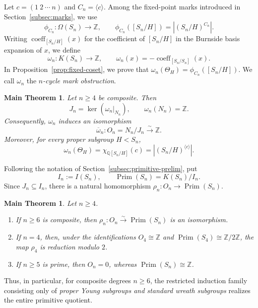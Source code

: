 \documentclass[a4paper,11pt]{article}
\numberwithin{equation}{section}
\newtheorem{maintheorem}[theorem]{Main Theorem}
\newcommand{\Q}{\mathbb{Q}}
\newcommand{\Z}{\mathbb{Z}}
\newcommand{\Prim}{\operatorname{Prim}}
\newcommand{\coeff}{\operatorname{coeff}}
\begin{document}
Let $c=(1\ 2\ \cdots\ n)$ and $C_n=\langle c\rangle$. Among the fixed-point marks introduced in Section~\ref{subsec:marks}, we use
\[
 \phi_{C_n}:\Omega(S_n)\longrightarrow\Z,
 \qquad \phi_{C_n}([S_n/H])=|(S_n/H)^{C_n}|.
\]
Writing $\coeff_{[S_n/H]}(x)$ for the coefficient of $[S_n/H]$
in the Burnside basis expansion of $x$, we define
\begin{equation}\label{eq:omega-intro}
  \omega_n:K(S_n)\longrightarrow\Z,
  \qquad \omega_n(x)=-\coeff_{[S_n/S_n]}(x).
\end{equation}
In Proposition~\ref{prop:fixed-coset}, we prove that
$\omega_n(\Theta_H)=\phi_{C_n}([S_n/H])$. We call $\omega_n$ the \emph{$n$-cycle mark obstruction}.

\begin{maintheorem}\label{thm:main}
Let $n\ge4$ be composite. Then
\[
  J_n=\ker(\omega_n|_{N_n}),\qquad
  \omega_n(N_n)=\Z.
\]
Consequently, $\omega_n$ induces an isomorphism
\[
  \overline\omega_n:O_n=N_n/J_n\xrightarrow{\sim}\Z.
\]
Moreover, for every proper subgroup $H<S_n$,
\begin{equation}\label{eq:fixed-main}
  \omega_n(\Theta_H)
  =\chi_{\Q[S_n/H]}(c)
  =|(S_n/H)^{\langle c\rangle}|.
\end{equation}
\end{maintheorem}

Following the notation of Section~\ref{subsec:primitive-prelim}, put
\[
  I_n:=I(S_n),\qquad \Prim(S_n)=K(S_n)/I_n.
\]
Since $J_n\subseteq I_n$, there is a natural homomorphism
$\rho_n:O_n\to\Prim(S_n)$.

\begin{maintheorem}\label{thm:primitive-comparison}
Let $n\ge4$.
\begin{enumerate}[label=\textup{(\roman*)},leftmargin=3em]
\item If $n\ge6$ is composite, then $\rho_n:O_n\xrightarrow{\sim}\Prim(S_n)$ is an isomorphism.
\item If $n=4$, then, under the identifications $O_4\cong\Z$ and $\Prim(S_4)\cong\Z/2\Z$, the map $\rho_4$ is reduction modulo $2$.
\item If $n\ge5$ is prime, then $O_n=0$, whereas $\Prim(S_n)\cong\Z$.
\end{enumerate}
\end{maintheorem}

Thus, in particular, for composite degrees $n\ge6$, the restricted induction family consisting only of \emph{proper Young subgroups and standard wreath subgroups} realizes the entire primitive quotient.
\end{document}

